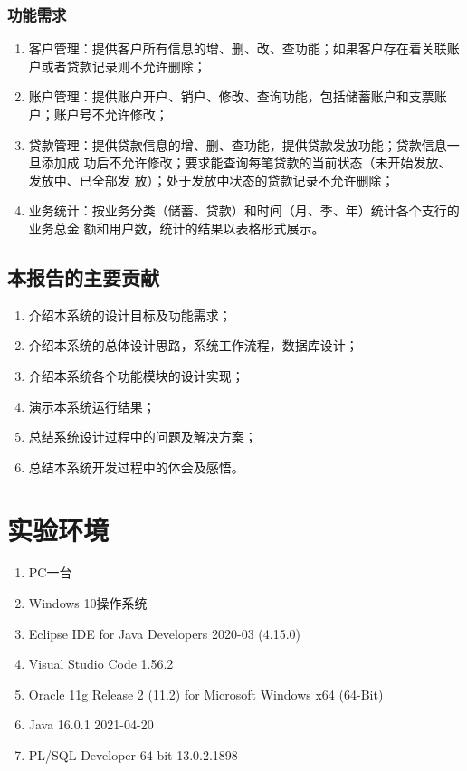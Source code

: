 \documentclass{ctexart}
\begin{document}
\subsubsection{\hei 功能需求}
\begin{enumerate}
    \item 客户管理：提供客户所有信息的增、删、改、查功能；如果客户存在着关联账户或者贷款记录则不允许删除；
    \item 账户管理：提供账户开户、销户、修改、查询功能，包括储蓄账户和支票账户；账户号不允许修改；
    \item 贷款管理：提供贷款信息的增、删、查功能，提供贷款发放功能；贷款信息一旦添加成
    功后不允许修改；要求能查询每笔贷款的当前状态（未开始发放、发放中、已全部发
    放）；处于发放中状态的贷款记录不允许删除；
    \item 业务统计：按业务分类（储蓄、贷款）和时间（月、季、年）统计各个支行的业务总金
    额和用户数，统计的结果以表格形式展示。
\end{enumerate}
\subsection{\hei 本报告的主要贡献}
\begin{enumerate}
    \item 介绍本系统的设计目标及功能需求；
    \item 介绍本系统的总体设计思路，系统工作流程，数据库设计；
    \item 介绍本系统各个功能模块的设计实现；
    \item 演示本系统运行结果；
    \item 总结系统设计过程中的问题及解决方案；
    \item 总结本系统开发过程中的体会及感悟。
\end{enumerate}
\section{\hei 实验环境}
\begin{enumerate}
    \item PC一台
    \item Windows 10操作系统
    \item Eclipse IDE for Java Developers 2020-03 (4.15.0)
    \item Visual Studio Code 1.56.2
    \item Oracle 11g Release 2 (11.2) for Microsoft Windows x64 (64-Bit)
    \item Java 16.0.1 2021-04-20
    \item PL/SQL Developer 64 bit 13.0.2.1898
\end{enumerate}
\end{document}
